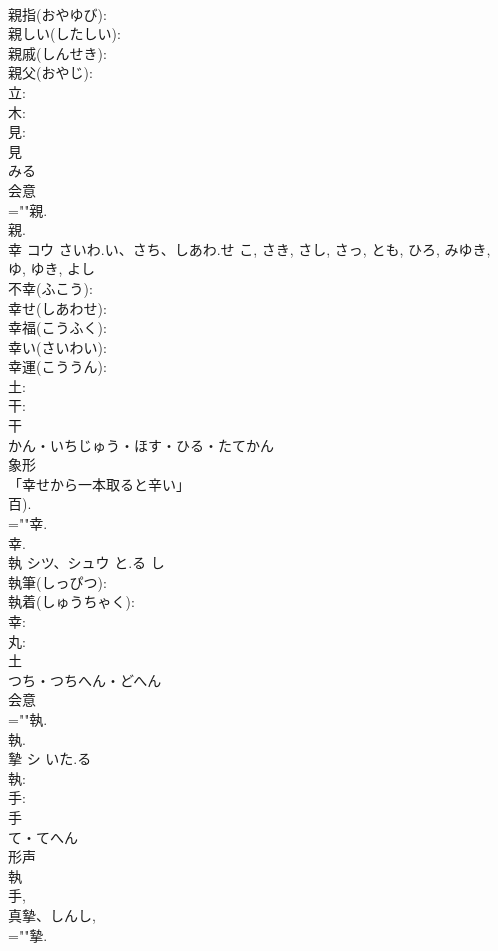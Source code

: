 \documentclass[8pt]{extreport}
\begin{document}
\begin{CJK}{UTF8}{min}
\\	親指(おやゆび): 
\\	親しい(したしい): 
\\	親戚(しんせき): 
\\	親父(おやじ): 
\\	立: 
\\	木: 
\\	見: 
\\	見	
\\	みる	
\\	会意 
\\	=""親.
\\	親.
\\	幸	コウ	さいわ.い、さち、しあわ.せ	こ, さき, さし, さっ, とも, ひろ, みゆき, ゆ, ゆき, よし	
\\	不幸(ふこう): 
\\	幸せ(しあわせ): 
\\	幸福(こうふく): 
\\	幸い(さいわい): 
\\	幸運(こううん): 
\\	土: 
\\	干: 
\\	干	
\\	かん・いちじゅう・ほす・ひる・たてかん	
\\	象形 
\\	「幸せから一本取ると辛い」 
\\	百).	
\\	=""幸.
\\	幸.
\\	執	シツ、シュウ	と.る	し	
\\	執筆(しっぴつ): 
\\	執着(しゅうちゃく): 
\\	幸: 
\\	丸: 
\\	土	
\\	つち・つちへん・どへん	
\\	会意 
\\	=""執.
\\	執.
\\	摯	シ	いた.る		
\\	執: 
\\	手: 
\\	手	
\\	て・てへん	
\\	形声 
\\	執 
\\	手, 
\\	真摯、しんし, 
\\	=""摯.

\end{CJK}
\end{document}

